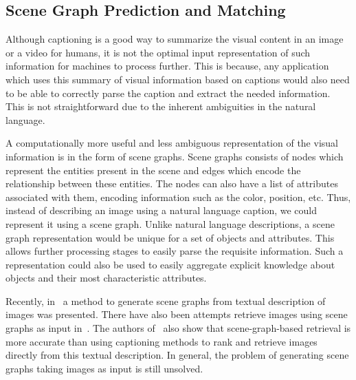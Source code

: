 \subsection{Scene Graph Prediction and Matching}
Although captioning is a good way to summarize the visual content in an
image or a video for humans, it is not the optimal input representation of such
information for machines to process further.
This is because, any application which uses this summary of visual
information based on captions would also need to be able to correctly parse the
caption and extract the needed information.
This is not straightforward due to the inherent ambiguities in the natural language.

A computationally more useful and less ambiguous representation of the visual
information is in the form of scene graphs.
Scene graphs consists of nodes which represent the entities present in the scene
and edges which encode the relationship between these entities.
The nodes can also have a list of attributes associated with them, encoding
information such as the color, position, etc.
Thus, instead of describing an image using a natural language caption, we could
represent it using a scene graph.
Unlike natural language descriptions, a scene graph representation would be unique
for a set of objects and attributes.
This allows further processing stages to easily parse the requisite information.
Such a representation could also be used to easily aggregate explicit knowledge
about objects and their most characteristic attributes.

Recently, in~\cite{schuster2015generating} a method to generate scene graphs
from textual description of images was presented.
There have also been attempts retrieve images using scene graphs as input
in~\cite{johnson2015image}.
The authors of~\cite{johnson2015image} also show that scene-graph-based
retrieval is more accurate than using captioning methods to rank and retrieve
images directly from this textual description.
In general, the problem of generating scene graphs taking images as input is
still unsolved.

